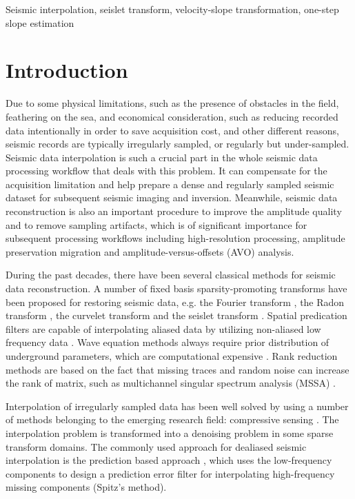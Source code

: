 \begin{keywords}
Seismic interpolation, seislet transform, velocity-slope transformation, one-step slope estimation
\end{keywords}

\section{Introduction} 
Due to some physical limitations, such as the presence of obstacles in the field, feathering on the sea, and economical consideration, such as reducing recorded data intentionally in order to save acquisition cost, and other different reasons, seismic records are typically irregularly sampled, or regularly but under-sampled. Seismic data interpolation is such a crucial part in the whole seismic data processing workflow that deals with this problem. It can compensate for the acquisition limitation and help prepare a dense and regularly sampled seismic dataset for subsequent seismic imaging and inversion.  Meanwhile, seismic data reconstruction is also an important procedure to improve the amplitude quality and to remove sampling artifacts, which is of significant importance for subsequent processing workflows including high-resolution processing, amplitude preservation migration and amplitude-versus-offsets (AVO) analysis.

During the past decades, there have been several classical methods for seismic data reconstruction. A number of fixed basis sparsity-promoting transforms have been proposed for restoring seismic data, e.g. the Fourier transform \cite{sacchi,naghizadehfourier,yangkang2014halfthr,yangkang2015eage2}, the Radon transform \cite{trad,yu,wangradon}, the curvelet transform \cite{herrmann,shahidi,liuwei2015} and the seislet transform \cite{seislet,shuwei20153,shuwei20164}.  Spatial predication filters are capable of interpolating aliased data by utilizing non-aliased low frequency data \cite{porsani}. Wave equation methods always require prior distribution of underground parameters, which are computational expensive \cite{ronen}. Rank reduction methods are based on the fact that missing traces and random noise can increase the rank of matrix, such as multichannel singular spectrum analysis (MSSA) \cite{oropezamssa,gaomssa}.

Interpolation of irregularly sampled data has been well solved by using a number of methods belonging to the emerging research field: compressive sensing \cite{donoho2006}. The interpolation problem is transformed into a denoising problem in some sparse transform domains. %
The commonly used approach for dealiased seismic interpolation is the prediction based approach \cite{spitz1991}, which uses the low-frequency components to design a prediction error filter for interpolating high-frequency missing components (Spitz's method). 

